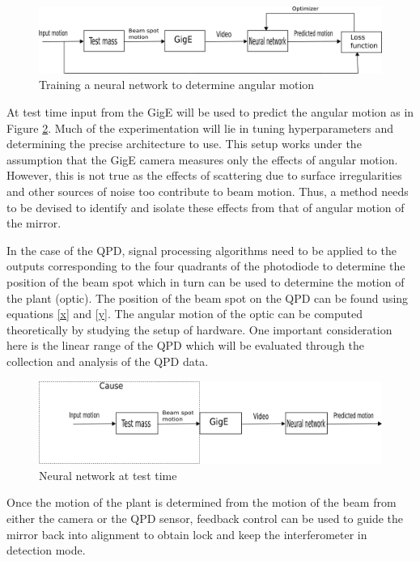 \documentclass[colorlinks=true,pdfstartview=FitV,linkcolor=blue,
            citecolor=red,urlcolor=magenta]{ligodoc}
\begin{document}
    \begin{figure}[htbp]
    \begin{center}
    \includegraphics[width =.7\linewidth]{train.pdf}
    \caption{Training a neural network to determine angular motion}
    \label{fig:train}
    \end{center}
    \end{figure}
    
    At test time input from the GigE will be used to predict the angular motion as in Figure \ref{fig:test}. Much of the experimentation will lie in tuning hyperparameters and determining the precise architecture to use. This setup works under the assumption that the GigE camera measures only the effects of angular motion. However, this is not true as the effects of scattering due to surface irregularities and other sources of noise too contribute to beam motion. Thus, a method needs to be devised to identify and isolate these effects from that of angular motion of the mirror. 

     In the case of the QPD, signal processing algorithms need to be applied to the outputs corresponding to the four quadrants of the photodiode to determine the position of the beam spot which in turn can be used to determine the motion of the plant (optic). The position of the beam spot on the QPD can be found using equations \ref{x} and \ref{y}. The angular motion of the optic can be computed theoretically by studying the setup of hardware. One important consideration here is the linear range of the QPD which will be evaluated through the collection and analysis of the QPD data. 

    \begin{figure}[htbp]
    \begin{center}
    \includegraphics[width =.7\linewidth]{test.pdf}
    \caption{Neural network at test time}
    \label{fig:test}
    \end{center}
    \end{figure}  

    Once the motion of the plant is determined from the motion of the beam from either the camera or the QPD sensor, feedback control can be used to guide the mirror back into alignment to obtain lock and keep the interferometer in detection mode.
     
\end{document}

